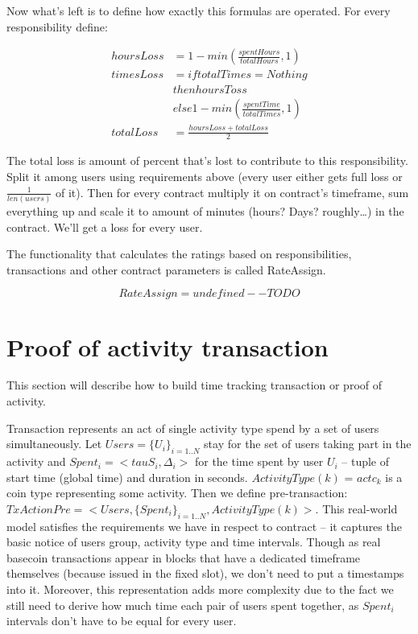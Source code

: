 \documentclass[]{itmo-student-thesis}
\begin{document}
Now what’s left is to define how exactly this formulas are operated. For every responsibility define:

\begin{align*}
hoursLoss &= 1 - min(\frac{spentHours}{totalHours}, 1) \\
timesLoss &= if totalTimes = Nothing \\
          &  then hoursToss \\
          &  else 1 - min(\frac{spentTime}{totalTimes}, 1) \\
totalLoss &= \frac{hoursLoss + totalLoss}{2}
\end{align*}

The total loss is amount of percent that’s lost to contribute to this
responsibility. Split it among users using requirements above (every
user either gets full loss or $\frac{1}{len(users)}$ of it). Then for every
contract multiply it on contract’s timeframe, sum everything up and
scale it to amount of minutes (hours? Days? roughly…) in the
contract. We’ll get a loss for every user.

The functionality that calculates the ratings based on
responsibilities, transactions and other contract parameters is called
RateAssign.

$$
RateAssign = undefined -- TODO
$$

\section{Proof of activity transaction}

This section will describe how to build time tracking transaction or
proof of activity.

Transaction represents an act of single activity type spend by a set
of users simultaneously. Let $Users = \{U_i\}_{i=1..N}$ stay for the
set of users taking part in the activity and $Spent_i = <tauS_i,
\Delta_i>$ for the time spent by user $U_i$ -- tuple of start time
(global time) and duration in seconds. $ActivityType(k)$ = $actc_k$ is
a coin type representing some activity. Then we define
pre-transaction: $TxActionPre = <Users, \{Spent_i\}_{i=1..N},
ActivityType(k)>$. This real-world model satisfies the requirements we
have in respect to contract -- it captures the basic notice of users
group, activity type and time intervals. Though as real basecoin
transactions appear in blocks that have a dedicated timeframe
themselves (because issued in the fixed slot), we don’t need to put a
timestamps into it. Moreover, this representation adds more complexity
due to the fact we still need to derive how much time each pair of
users spent together, as $Spent_i$ intervals don’t have to be equal
for every user.
\end{document}
